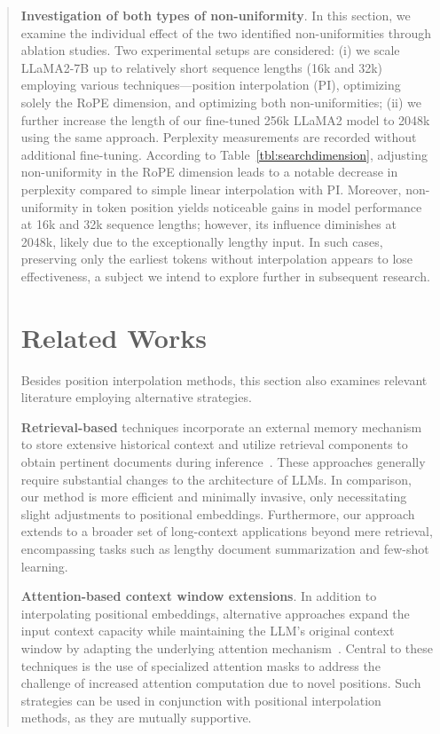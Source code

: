 \begin{abstract}
\textbf{Investigation of both types of non-uniformity}. In this section, we examine the individual effect of the two identified non-uniformities through ablation studies. Two experimental setups are considered: (i) we scale LLaMA2-7B up to relatively short sequence lengths (16k and 32k) employing various techniques—position interpolation (PI), optimizing solely the RoPE dimension, and optimizing both non-uniformities; (ii) we further increase the length of our fine-tuned 256k LLaMA2 model to 2048k using the same approach. Perplexity measurements are recorded without additional fine-tuning. According to Table~\ref{tbl:searchdimension}, adjusting non-uniformity in the RoPE dimension leads to a notable decrease in perplexity compared to simple linear interpolation with PI. Moreover, non-uniformity in token position yields noticeable gains in model performance at 16k and 32k sequence lengths; however, its influence diminishes at 2048k, likely due to the exceptionally lengthy input. In such cases, preserving only the earliest tokens without interpolation appears to lose effectiveness, a subject we intend to explore further in subsequent research.

\section{Related Works}

Besides position interpolation methods, this section also examines relevant literature employing alternative strategies.

\textbf{Retrieval-based} techniques incorporate an external memory mechanism to store extensive historical context and utilize retrieval components to obtain pertinent documents during inference~\cite{longllama,wang2023augmenting,borgeaud2022improving}. These approaches generally require substantial changes to the architecture of LLMs. In comparison, our method is more efficient and minimally invasive, only necessitating slight adjustments to positional embeddings. Furthermore, our approach extends to a broader set of long-context applications beyond mere retrieval, encompassing tasks such as lengthy document summarization and few-shot learning.

\textbf{Attention-based context window extensions}. In addition to interpolating positional embeddings, alternative approaches expand the input context capacity while maintaining the LLM’s original context window by adapting the underlying attention mechanism~\cite{han2023lminfinite, streamingllm,parallelwindow}. Central to these techniques is the use of specialized attention masks to address the challenge of increased attention computation due to novel positions. Such strategies can be used in conjunction with positional interpolation methods, as they are mutually supportive.


\end{abstract}
